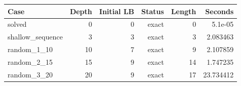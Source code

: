 {\small
\begin{tabular}{lrrrrr}
\hline
Case & Depth & Initial LB & Status & Length & Seconds \\
\hline
solved & 0 & 0 & exact & 0 & 5.1e-05 \\
shallow\_sequence & 3 & 3 & exact & 3 & 2.083463 \\
random\_1\_10 & 10 & 7 & exact & 9 & 2.107859 \\
random\_2\_15 & 15 & 9 & exact & 14 & 1.747235 \\
random\_3\_20 & 20 & 9 & exact & 17 & 23.734412 \\
\hline
\end{tabular}
}

